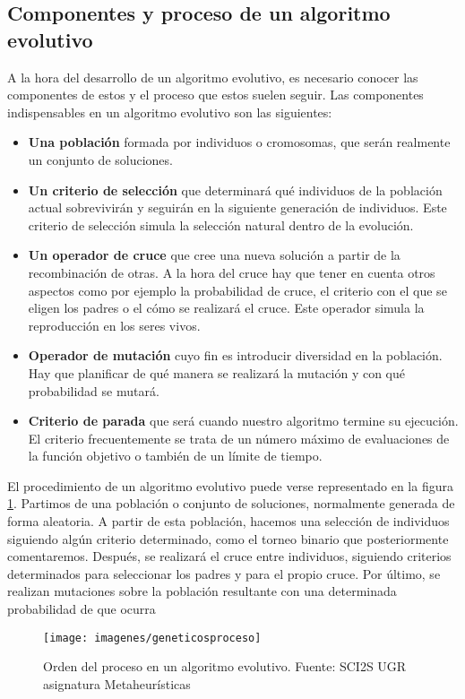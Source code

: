 \subsection{Componentes y proceso de un algoritmo evolutivo}\label{componentesevo}
A la hora del desarrollo de un algoritmo evolutivo, es necesario conocer las componentes de estos y el proceso que estos suelen seguir. Las componentes indispensables en un algoritmo evolutivo son las siguientes:
\begin{itemize}
	\item \textbf{Una población} formada por individuos o cromosomas, que serán realmente un conjunto de soluciones.
	\item \textbf{Un criterio de selección} que determinará qué individuos de la población actual sobrevivirán y seguirán en la siguiente generación de individuos. Este criterio de selección simula la selección natural dentro de la evolución.
	\item \textbf{Un operador de cruce} que cree una nueva solución a partir de la recombinación de otras. A la hora del cruce hay que tener en cuenta otros aspectos como por ejemplo la probabilidad de cruce, el criterio con el que se eligen los padres o el cómo se realizará el cruce. Este operador simula la reproducción en los seres vivos.
	\item \textbf{Operador de mutación} cuyo fin es introducir diversidad en la población. Hay que planificar de qué manera se realizará la mutación y con qué probabilidad se mutará.
	\item \textbf{Criterio de parada} que será cuando nuestro algoritmo termine su ejecución. El criterio frecuentemente se trata de un número máximo de evaluaciones de la función objetivo o también de un límite de tiempo. 
\end{itemize}

El procedimiento de un algoritmo evolutivo puede verse representado en la figura \ref{fig:geneticosproceso}. Partimos de una población o conjunto de soluciones, normalmente generada de forma aleatoria. A partir de esta población, hacemos una selección de individuos siguiendo algún criterio determinado, como el torneo binario que posteriormente comentaremos. Después, se realizará el cruce entre individuos, siguiendo criterios determinados para seleccionar los padres y para el propio cruce. Por último, se realizan mutaciones sobre la población resultante con una determinada probabilidad de que ocurra

\begin{figure} [H]
	\centering
	\texttt{[image: imagenes/geneticosproceso]}
	\caption{Orden del proceso en un algoritmo evolutivo. Fuente: SCI2S UGR asignatura Metaheurísticas}
	\label{fig:geneticosproceso}
\end{figure}



